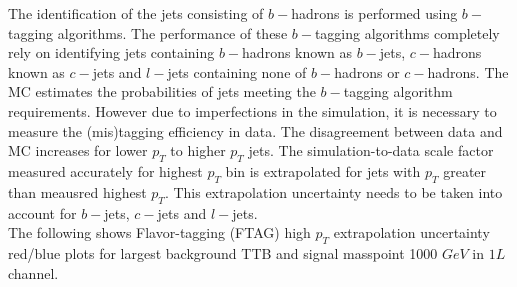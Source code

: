 The identification of the jets consisting of $b-$hadrons is performed using $b-$tagging algorithms. The performance of these $b-$tagging algorithms completely rely on identifying jets containing $b-$hadrons known as $b-$jets, $c-$hadrons known as $c-$jets and $l-$jets containing none of $b-$hadrons or $c-$hadrons. The MC estimates the probabilities of jets meeting the $b-$tagging algorithm requirements. However due to imperfections in the simulation, it is necessary to measure the (mis)tagging efficiency in data. The disagreement between data and MC increases for lower $p_T$ to higher $p_T$ jets. The simulation-to-data scale factor measured accurately for highest $p_T$ bin is extrapolated for jets with $p_T$ greater than meausred highest $p_T$. This extrapolation uncertainty needs to be taken into account for $b-$jets, $c-$jets and $l-$jets.\\
The following shows Flavor-tagging (FTAG) high $p_T$ extrapolation uncertainty red/blue plots for largest background TTB and signal masspoint 1000 $GeV$ in $1L$ channel.


